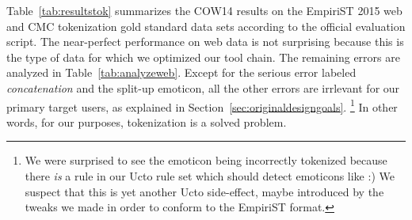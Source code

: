 \documentclass[11pt]{article}
\begin{document}
Table~\ref{tab:resultstok} summarizes the COW14 results on the EmpiriST 2015 web and CMC tokenization gold standard data sets according to the official evaluation script.
The near-perfect performance on web data is not surprising because this is the type of data for which we optimized our tool chain.
The remaining errors are analyzed in Table~\ref{tab:analyzeweb}.
Except for the serious error labeled \textit{concatenation} and the split-up emoticon, all the other errors are irrlevant for our primary target users, as explained in Section~\ref{sec:originaldesigngoals}.%
\footnote{We were surprised to see the emoticon being incorrectly tokenized because there \textit{is} a rule in our Ucto rule set which should detect emoticons like :)
We suspect that this is yet another Ucto side-effect, maybe introduced by the tweaks we made in order to conform to the EmpiriST format.}
In other words, for our purposes, tokenization is a solved problem.

\begin{table*}[!htb]
  \centering
  \caption{Breakdown of tokenizer errors by types for the web data}
  \label{tab:analyzeweb}
\end{table*}
\end{document}
